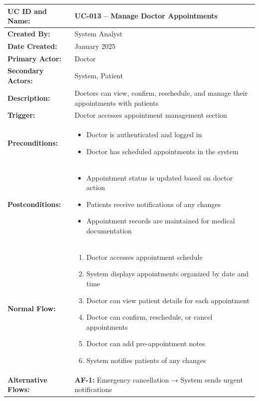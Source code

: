 \documentclass[12pt,a4paper]{article}
\begin{document}
\renewcommand{\arraystretch}{1.5}
\begin{longtable}{|p{4.5cm}|p{10.5cm}|}
\hline
\textbf{UC ID and Name:} & UC-013 – Manage Doctor Appointments \\
\hline
\textbf{Created By:} & System Analyst \\
\hline
\textbf{Date Created:} & January 2025 \\
\hline
\textbf{Primary Actor:} & Doctor \\
\hline
\textbf{Secondary Actors:} & System, Patient \\
\hline
\textbf{Description:} & Doctors can view, confirm, reschedule, and manage their appointments with patients \\
\hline
\textbf{Trigger:} & Doctor accesses appointment management section \\
\hline
\textbf{Preconditions:} &
\begin{itemize}
  \item Doctor is authenticated and logged in
  \item Doctor has scheduled appointments in the system
\end{itemize} \\
\hline
\textbf{Postconditions:} &
\begin{itemize}
  \item Appointment status is updated based on doctor action
  \item Patients receive notifications of any changes
  \item Appointment records are maintained for medical documentation
\end{itemize} \\
\hline
\textbf{Normal Flow:} &
\begin{enumerate}
  \item Doctor accesses appointment schedule
  \item System displays appointments organized by date and time
  \item Doctor can view patient details for each appointment
  \item Doctor can confirm, reschedule, or cancel appointments
  \item Doctor can add pre-appointment notes
  \item System notifies patients of any changes
\end{enumerate} \\
\hline
\textbf{Alternative Flows:} &
\textbf{AF-1:} Emergency cancellation → System sends urgent notifications \\

\end{longtable}
\end{document}
